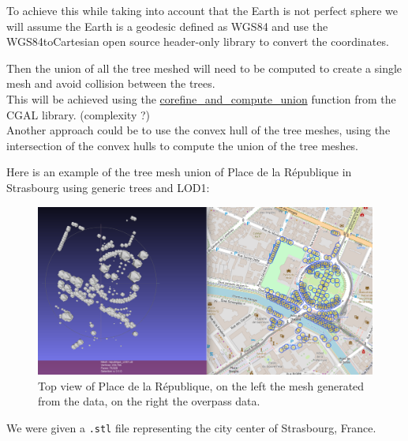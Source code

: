 \documentclass[12pt]{article}
\begin{document}
To achieve this while taking into account that the Earth is not perfect sphere
 we will assume the Earth is a geodesic defined as WGS84 \cite{wgs84} and use 
 the WGS84toCartesian\cite{wgs84_to_cartesian} open source header-only
  library to convert the coordinates.

Then the union of all the tree meshed will need to be computed to create a single mesh
and avoid collision between the trees. \\
This will be achieved using the \href{https://doc.cgal.org/latest/Polygon_mesh_processing/group__PMP__corefinement__grp.html}{corefine\_and\_compute\_union} function from the CGAL library.
(complexity ?) \\
Another approach could be to use the convex hull of the tree meshes, using the
intersection of the convex hulls to compute the union of the tree meshes.

Here is an example of the tree mesh union of Place de la République in Strasbourg
using generic trees and LOD1:

\begin{figure}[H]
    \centering
        \centering
        \includegraphics[width=\textwidth]{images/mesh_vs_overpass.png}
        \caption{Top view of Place de la République, on the left the mesh generated from the data,
        on the right the overpass data.}

\end{figure}


We were given a \texttt{.stl} file representing the city center of Strasbourg, France.
\end{document}
